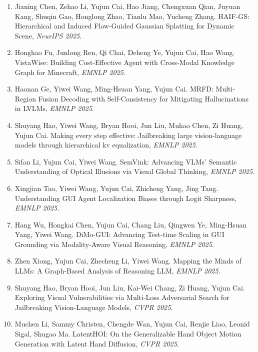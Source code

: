 \begin{enumerate}
\item Jianing Chen, Zehao Li, Yujun Cai, Hao Jiang, Chengxuan Qian, Juyuan Kang, Shuqin Gao, Honglong Zhao, Tianlu Mao, Yucheng Zhang. HAIF-GS: Hierarchical and Induced Flow-Guided Gaussian Splatting for Dynamic Scene, \textit{NeurIPS 2025}.

\item Honghao Fu, Junlong Ren, Qi Chai, Deheng Ye, Yujun Cai, Hao Wang. VistaWise: Building Cost-Effective Agent with Cross-Modal Knowledge Graph for Minecraft, \textit{EMNLP 2025}.

\item Haonan Ge, Yiwei Wang, Ming-Hsuan Yang, Yujun Cai. MRFD: Multi-Region Fusion Decoding with Self-Consistency for Mitigating Hallucinations in LVLMs, \textit{EMNLP 2025}.

\item Shuyang Hao, Yiwei Wang, Bryan Hooi, Jun Liu, Muhao Chen, Zi Huang, Yujun Cai. Making every step effective: Jailbreaking large vision-language models through hierarchical kv equalization, \textit{EMNLP 2025}.

\item Sifan Li, Yujun Cai, Yiwei Wang. SemVink: Advancing VLMs' Semantic Understanding of Optical Illusions via Visual Global Thinking, \textit{EMNLP 2025}.

\item Xingjian Tao, Yiwei Wang, Yujun Cai, Zhicheng Yang, Jing Tang. Understanding GUI Agent Localization Biases through Logit Sharpness, \textit{EMNLP 2025}.

\item Hang Wu, Hongkai Chen, Yujun Cai, Chang Liu, Qingwen Ye, Ming-Hsuan Yang, Yiwei Wang. DiMo-GUI: Advancing Test-time Scaling in GUI Grounding via Modality-Aware Visual Reasoning, \textit{EMNLP 2025}.

\item Zhen Xiong, Yujun Cai, Zhecheng Li, Yiwei Wang. Mapping the Minds of LLMs: A Graph-Based Analysis of Reasoning LLM, \textit{EMNLP 2025}.

\item Shuyang Hao, Bryan Hooi, Jun Liu, Kai-Wei Chang, Zi Huang, Yujun Cai. Exploring Visual Vulnerabilities via Multi-Loss Adversarial Search for Jailbreaking Vision-Language Models, \textit{CVPR 2025}.

\item Muchen Li, Sammy Christen, Chengde Wan, Yujun Cai, Renjie  Liao, Leonid Sigal, Shugao Ma. LatentHOI: On the Generalizable Hand Object Motion Generation with Latent Hand Diffusion, \textit{CVPR 2025}.


\end{enumerate}
